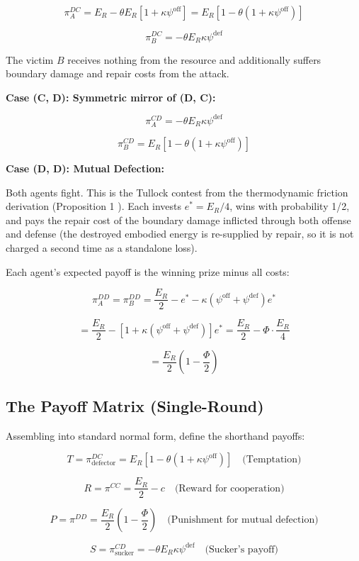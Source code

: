 \documentclass[11pt]{article}
\theoremstyle{plain}
\theoremstyle{definition}
\theoremstyle{remark}
\let\origsubsection\subsection
\renewcommand{\subsection}{\needspace{7\baselineskip}\origsubsection}
\begin{document}
\[\pi_A^{DC} = E_R - \theta E_R \left[1 + \kappa\psi^{\text{off}}\right] = E_R\left[1 - \theta(1 + \kappa\psi^{\text{off}})\right]\]

\[\pi_B^{DC} = -\theta E_R \kappa\psi^{\text{def}}\]

The victim \(B\) receives nothing from the resource and additionally
suffers boundary damage and repair costs from the attack.

\textbf{Case (C, D): Symmetric mirror of (D, C):}

\[\pi_A^{CD} = -\theta E_R \kappa\psi^{\text{def}}\]

\[\pi_B^{CD} = E_R\left[1 - \theta(1 + \kappa\psi^{\text{off}})\right]\]

\textbf{Case (D, D): Mutual Defection:}

Both agents fight. This is the Tullock contest from the thermodynamic
friction derivation (Proposition 1 \citep{TC-IV}). Each invests
\(e^* = E_R/4\), wins with probability 1/2, and pays the repair cost of
the boundary damage inflicted through both offense and defense (the
destroyed embodied energy is re-supplied by repair, so it is not charged
a second time as a standalone loss).

Each agent's expected payoff is the winning prize minus all costs:

\[\pi_A^{DD} = \pi_B^{DD} = \frac{E_R}{2} - e^* - \kappa(\psi^{\text{off}} + \psi^{\text{def}}) e^*\]

\[= \frac{E_R}{2} - \left[1 + \kappa(\psi^{\text{off}} + \psi^{\text{def}})\right] e^* = \frac{E_R}{2} - \Phi \cdot \frac{E_R}{4}\]

\[= \frac{E_R}{2}\left(1 - \frac{\Phi}{2}\right)\]

\subsection{The Payoff Matrix
(Single-Round)}\label{the-payoff-matrix-single-round}

Assembling into standard normal form, define the shorthand payoffs:

\[T = \pi^{DC}_{\text{defector}} = E_R\left[1 - \theta(1 + \kappa\psi^{\text{off}})\right] \quad \text{(Temptation)}\]

\[R = \pi^{CC} = \frac{E_R}{2} - c \quad \text{(Reward for cooperation)}\]

\[P = \pi^{DD} = \frac{E_R}{2}\left(1 - \frac{\Phi}{2}\right) \quad \text{(Punishment for mutual defection)}\]

\[S = \pi^{CD}_{\text{sucker}} = -\theta E_R \kappa\psi^{\text{def}} \quad \text{(Sucker's payoff)}\]
\end{document}
